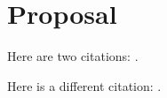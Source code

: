 \documentclass[12pt]{article}
\begin{document}
\section*{Proposal}

Here are two citations: \cite{Walker2015a,Feldmann2010}.

Here is a different citation: \cite{Kremer2015}.



\end{document}

